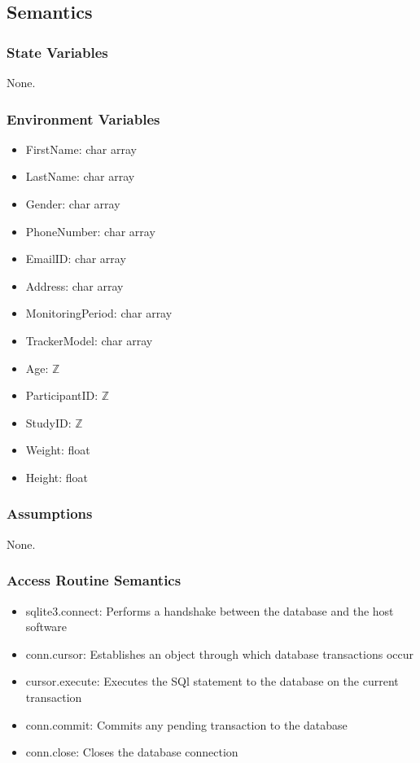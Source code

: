 \documentclass[12pt, titlepage]{article}
\begin{document}
\subsection{Semantics}

\subsubsection{State Variables}

None.

\subsubsection{Environment Variables}

\begin{itemize}
\item FirstName: char array
\item LastName: char array
\item Gender: char array
\item PhoneNumber: char array
\item EmailID: char array
\item Address: char array
\item MonitoringPeriod: char array
\item TrackerModel: char array
\item Age: $\mathbb{Z}$
\item ParticipantID: $\mathbb{Z}$
\item StudyID: $\mathbb{Z}$
\item Weight: float
\item Height: float
\end{itemize}

\subsubsection{Assumptions}
None.
\subsubsection{Access Routine Semantics}
\begin{itemize}
\item sqlite3.connect: Performs a handshake between the database and the host software
\item conn.cursor: Establishes an object through which database transactions occur
\item cursor.execute: Executes the SQl statement to the database on the current transaction
\item conn.commit: Commits any pending transaction to the database
\item conn.close: Closes the database connection

\end{itemize}
\end{document}
